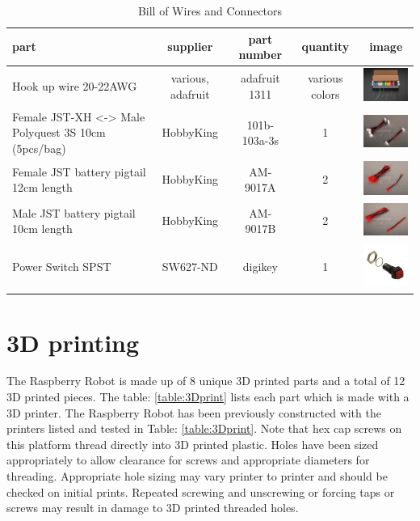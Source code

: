 \documentclass[12pt,titlepage,oneside]{memoir}
\begin{document}
\begin{table}[!h]
\begin{tabular}{p{5cm} | c | c | c | c}
part & supplier & part number & quantity & image \\
\hline
Hook up wire 20-22AWG & various, adafruit & adafruit 1311 & various colors & \includegraphics[width=80px]{picture/wires.jpg}\\
Female JST-XH <-> Male Polyquest 3S 10cm (5pcs/bag) & HobbyKing & 101b-103a-3s & 1 & \includegraphics[width=80px]{picture/jstext.jpg}\\
Female JST battery pigtail 12cm length & HobbyKing & AM-9017A & 2 & \includegraphics[width=80px]{picture/fjst.jpg}\\
Male JST battery pigtail 10cm length & HobbyKing & AM-9017B & 2 & \includegraphics[width=80px]{picture/mjst.jpg}\\
Power Switch SPST & SW627-ND & digikey & 1 & \includegraphics[width=80px]{picture/pwr.jpg}

\end{tabular}
\caption{Bill of Wires and Connectors}
\label{table:wires}
\end{table}


\section{3D printing}

The Raspberry Robot is made up of 8 unique 3D printed parts and a total of 12 3D printed pieces. The table: \ref{table:3Dprint} lists each part which is made with a 3D printer. The Raspberry Robot has been previously constructed with the printers listed and tested in Table: \ref{table:3Dprint}. Note that hex cap screws on this platform thread directly into 3D printed plastic. Holes have been sized appropriately to allow clearance for screws and appropriate diameters for threading. Appropriate hole sizing may vary printer to printer and should be checked on initial prints. Repeated screwing and unscrewing or forcing taps or screws may result in damage to 3D printed threaded holes.  
\end{document}
